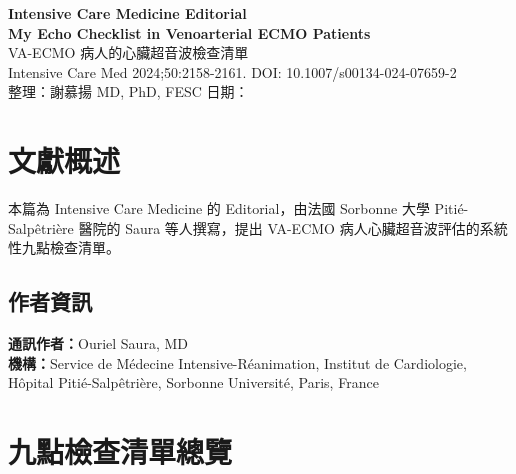 \documentclass[12pt,a4paper]{article}
\begin{document}
\begin{center}
{\LARGE\bfseries\textcolor{emergency_red}{Intensive Care Medicine Editorial}}\\[0.5cm]
{\Large\textbf{My Echo Checklist in Venoarterial ECMO Patients}}\\[0.3cm]
{\large VA-ECMO 病人的心臟超音波檢查清單}\\[0.5cm]
{\normalsize Intensive Care Med 2024;50:2158-2161. DOI: 10.1007/s00134-024-07659-2}\\[0.3cm]
{\normalsize 整理：謝慕揚 MD, PhD, FESC \quad 日期：\mydate}
\end{center}


\tableofcontents
\newpage

\section{文獻概述}

本篇為 Intensive Care Medicine 的 Editorial，由法國 Sorbonne 大學 Pitié-Salpêtrière 醫院的 Saura 等人撰寫，提出 VA-ECMO 病人心臟超音波評估的系統性九點檢查清單。

\subsection{作者資訊}
\textbf{通訊作者：}Ouriel Saura, MD\\
\textbf{機構：}Service de Médecine Intensive-Réanimation, Institut de Cardiologie, Hôpital Pitié-Salpêtrière, Sorbonne Université, Paris, France

\section{九點檢查清單總覽}
\end{document}
